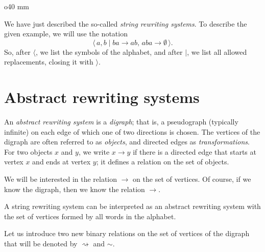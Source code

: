 {

\begin{wrapfigure}{o}{40 mm}
\vskip-0mm
\centering
{}
\vskip-2mm
\end{wrapfigure}

We have just described the so-called \emph{string rewriting systems}.
To describe the given example, we will use the notation
\[\langle\, a,b \mid ba\to ab,\, aba\to\emptyset\,\rangle.\]
So, after $\langle$, we list the symbols of the alphabet, and after $\mid$, we list all allowed replacements, closing it with $\rangle$.

}

\section{Abstract rewriting systems}

An \emph{abstract rewriting system} is a \emph{digraph};
that is, a pseudograph (typically infinite) on each edge of which one of two directions is chosen.
The vertices of the digraph are often referred to as \emph{objects}, and directed edges as \emph{transformations}.
For two objects $x$ and $y$, we write $x \to y$ if there is a directed edge that starts at vertex $x$ and ends at vertex $y$; it defines a relation on the set of objects.

We will be interested in the relation $\to$ on the set of vertices.
Of course, if we know the digraph, then we know the relation $\to$.

A string rewriting system can be interpreted as an abstract rewriting system with the set of vertices formed by
all words in the alphabet.

Let us introduce two new binary relations on the set of vertices of the digraph that will be denoted by $\rightsquigarrow$ and $\sim$.

